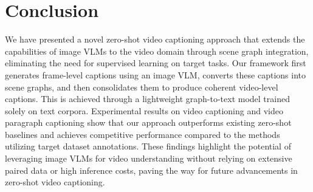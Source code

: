 
\section{Conclusion}
\label{sec:conclusion}
We have presented a novel zero-shot video captioning approach that extends the capabilities of image VLMs to the video domain through scene graph integration, eliminating the need for supervised learning on target tasks.
Our framework first generates frame-level captions using an image VLM, converts these captions into scene graphs, and then consolidates them to produce coherent video-level captions. 
This is achieved through a lightweight graph-to-text model trained solely on text corpora.
Experimental results on video captioning and video paragraph captioning show that our approach outperforms existing zero-shot baselines and achieves competitive performance compared to the methods utilizing target dataset annotations. 
These findings highlight the potential of leveraging image VLMs for video understanding without relying on extensive paired data or high inference costs, paving the way for future advancements in zero-shot video captioning.






